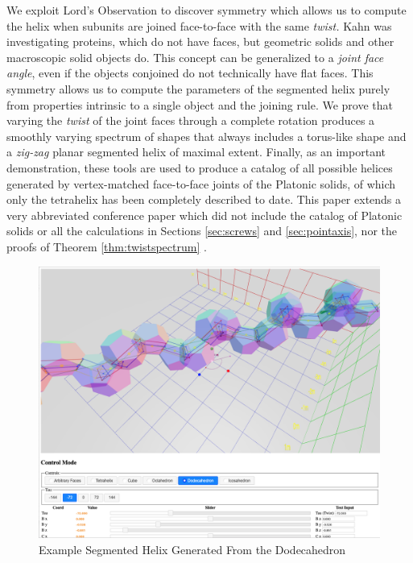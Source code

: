 \documentclass[mathematics,article,submit,pdftex,moreauthors]{Definitions/mdpi}
\begin{document}
We exploit Lord's Observation to discover symmetry which allows us to compute the helix when subunits are joined face-to-face with
the same {\em twist.} Kahn was investigating proteins, which do not have faces, but geometric solids and other macroscopic solid objects do.
This concept can be generalized to a {\em joint face angle}, even if the
objects conjoined do not technically have flat faces.
This symmetry allows us to compute the parameters of the segmented helix purely from
properties intrinsic to a single object and the joining rule.
We prove that varying the {\em twist} of the joint faces through a complete rotation produces a smoothly varying
spectrum of shapes that always includes a torus-like shape and a
{\em zig-zag} planar segmented helix of maximal extent.
Finally, as an important demonstration, these tools are used to produce
a catalog of all possible helices generated by vertex-matched face-to-face joints of the
Platonic solids, of which only the tetrahelix \cite{coxeter1985simplicial,sadler2019periodic,fuller1982synergetics,read2018transforming,pearce1990structure}
has been completely described to date.
This paper extends a very abbreviated conference paper which did not include the catalog of Platonic solids
or all the calculations in Sections \ref{sec:screws} and \ref{sec:pointaxis}, nor the proofs of Theorem \ref{thm:twistspectrum} \cite{read2020calculating}.

\begin{figure}[H]
  \centering
  \captionsetup{justification=centering}
     \includegraphics[width=10.5 cm]{figures/Dodecahedral.png}
     \caption{Example Segmented Helix Generated From the Dodecahedron}
  \label{fig:dodecahedron}
\end{figure}
\unskip
\end{document}
